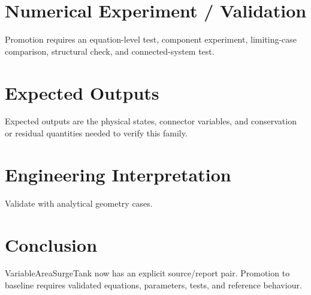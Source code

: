 \documentclass[10pt,a4paper]{article}
\begin{document}
\section{Numerical Experiment / Validation}Promotion requires an equation-level test, component experiment, limiting-case comparison, structural check, and connected-system test.
\section{Expected Outputs}Expected outputs are the physical states, connector variables, and conservation or residual quantities needed to verify this family.
\section{Engineering Interpretation}Validate with analytical geometry cases.
\section*{Conclusion}VariableAreaSurgeTank now has an explicit source/report pair. Promotion to baseline requires validated equations, parameters, tests, and reference behaviour.
\end{document}
